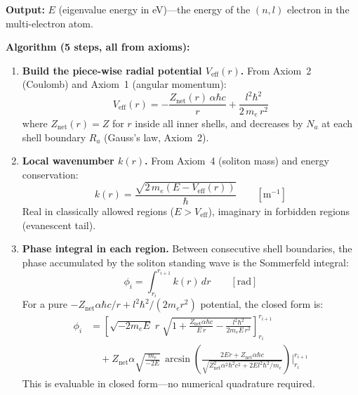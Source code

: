 \noindent\textbf{Output:}
$E$ (eigenvalue energy in eV)---the energy of the
$(n, l)$ electron in the multi-electron atom.

\noindent\textbf{Algorithm (5 steps, all from axioms):}

\begin{enumerate}
\item \textbf{Build the piece-wise radial potential
$V_{\text{eff}}(r)$.}
From Axiom~2 (Coulomb) and Axiom~1 (angular momentum):\vspace{-4pt}
\begin{equation}
    V_{\text{eff}}(r) = -\frac{Z_{\text{net}}(r)\,
    \alpha\hbar c}{r}
    + \frac{l^2\hbar^2}{2\,m_e\,r^2}
    \label{eq:V_eff_radial}
\end{equation}
where $Z_{\text{net}}(r) = Z$ for $r$ inside all
inner shells, and decreases by $N_a$ at each
shell boundary $R_a$ (Gauss's law, Axiom~2).

\item \textbf{Local wavenumber $k(r)$.}
From Axiom~4 (soliton mass) and energy conservation:\vspace{-4pt}
\begin{equation}
    k(r) = \frac{\sqrt{2\,m_e(E - V_{\text{eff}}(r))}}
    {\hbar}
    \qquad [\text{m}^{-1}]
    \label{eq:k_local}
\end{equation}
Real in classically allowed regions ($E > V_{\text{eff}}$),
imaginary in forbidden regions (evanescent tail).

\item \textbf{Phase integral in each region.}
Between consecutive shell boundaries, the phase
accumulated by the soliton standing wave is the
Sommerfeld integral:\vspace{-4pt}
\begin{equation}
    \phi_i = \int_{r_{i}}^{r_{i+1}} k(r)\,dr
    \qquad [\text{rad}]
    \label{eq:phase_integral}
\end{equation}
For a pure $-Z_{\text{net}}\alpha\hbar c / r
+ l^2\hbar^2/(2m_e r^2)$ potential, the closed form
is:\vspace{-4pt}
\begin{align}
    \phi_i &= \left[
    \sqrt{-2m_e E}\;r
    \;\sqrt{1 + \frac{Z_{\text{net}}\alpha\hbar c}{E\,r}
    - \frac{l^2\hbar^2}{2m_e E\,r^2}}
    \right]_{r_i}^{r_{i+1}} \nonumber \\
    &\quad + Z_{\text{net}}\alpha
    \sqrt{\frac{m_e}{-2E}}\,
    \arcsin\!\left(\frac{2Er + Z_{\text{net}}
    \alpha\hbar c}{\sqrt{Z_{\text{net}}^2\alpha^2\hbar^2 c^2
    + 2El^2\hbar^2/m_e}}\right)
    \Bigg|_{r_i}^{r_{i+1}}
\end{align}
This is evaluable in closed form---no numerical
quadrature required.


\end{enumerate}
